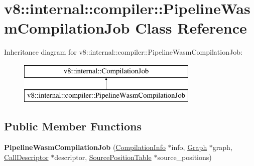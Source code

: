 \hypertarget{classv8_1_1internal_1_1compiler_1_1_pipeline_wasm_compilation_job}{}\section{v8\+:\+:internal\+:\+:compiler\+:\+:Pipeline\+Wasm\+Compilation\+Job Class Reference}
\label{classv8_1_1internal_1_1compiler_1_1_pipeline_wasm_compilation_job}
Inheritance diagram for v8\+:\+:internal\+:\+:compiler\+:\+:Pipeline\+Wasm\+Compilation\+Job\+:\begin{figure}[H]
\begin{center}
\leavevmode
\includegraphics[height=2.000000cm]{classv8_1_1internal_1_1compiler_1_1_pipeline_wasm_compilation_job}
\end{center}
\end{figure}
\subsection*{Public Member Functions}
\begin{DoxyCompactItemize}
\item 
{\bfseries Pipeline\+Wasm\+Compilation\+Job} (\hyperlink{classv8_1_1internal_1_1_compilation_info}{Compilation\+Info} $\ast$info, \hyperlink{classv8_1_1internal_1_1compiler_1_1_graph}{Graph} $\ast$graph, \hyperlink{classv8_1_1internal_1_1compiler_1_1_call_descriptor}{Call\+Descriptor} $\ast$descriptor, \hyperlink{classv8_1_1internal_1_1compiler_1_1_source_position_table}{Source\+Position\+Table} $\ast$source\+\_\+positions)\hypertarget{classv8_1_1internal_1_1compiler_1_1_pipeline_wasm_compilation_job_a6b4307a64f3fe24948a15bf766052f94}{}\label{classv8_1_1internal_1_1compiler_1_1_pipeline_wasm_compilation_job_a6b4307a64f3fe24948a15bf766052f94}

\end{DoxyCompactItemize}
